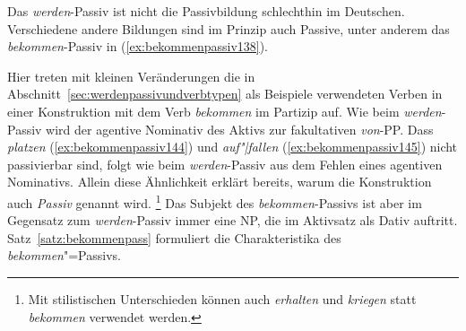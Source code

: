 Das \textit{werden}-Passiv ist nicht die Passivbildung schlechthin im Deutschen.
Verschiedene andere Bildungen sind im Prinzip auch Passive, unter anderem das \textit{bekommen}-Passiv in (\ref{ex:bekommenpassiv138}).

\begin{exe}
  \ex\label{ex:bekommenpassiv138}
  \begin{xlist}
  \end{xlist}
\end{exe}

Hier treten mit kleinen Veränderungen die in Abschnitt~\ref{sec:werdenpassivundverbtypen} als Beispiele verwendeten Verben in einer Konstruktion mit dem Verb \textit{bekommen} im Partizip auf.
Wie beim \textit{werden}-Passiv wird der agentive Nominativ des Aktivs zur fakultativen \textit{von}-PP.
Dass \textit{platzen} (\ref{ex:bekommenpassiv144}) und \textit{auf"|fallen} (\ref{ex:bekommenpassiv145}) nicht passivierbar sind, folgt wie beim \textit{werden}-Passiv aus dem Fehlen eines agentiven Nominativs.
Allein diese Ähnlichkeit erklärt bereits, warum die Konstruktion auch \textit{Passiv} genannt wird.%
\footnote{Mit stilistischen Unterschieden können auch \textit{erhalten} und \textit{kriegen} statt \textit{bekommen} verwendet werden.}
Das Subjekt des \textit{bekommen}-Passivs ist aber im Gegensatz zum \textit{werden}-Passiv immer eine NP, die im Aktivsatz als Dativ auftritt.
Satz~\ref{satz:bekommenpass} formuliert die Charakteristika des \textit{bekommen}"=Passivs.



